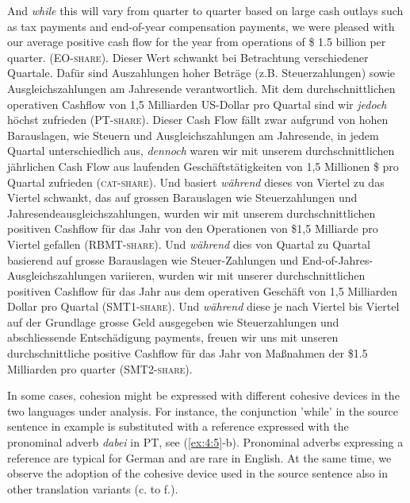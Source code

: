 \documentclass[output=paper]{LSP/langsci}
\begin{document}
\ea \label{ex:4:4}
\ea And \textit{while} this will vary from quarter to quarter based on large cash outlays such as tax payments and end-of-year compensation payments, we were pleased with our average positive cash flow for the year from operations of \$ 1.5 billion per quarter. (EO-\textsc{share}).
\ex Dieser Wert schwankt bei Betrachtung verschiedener Quartale. Dafür sind Auszahlungen hoher Beträge (z.B. Steuerzahlungen) sowie Ausgleichszahlungen am Jahresende verantwortlich. Mit dem durchschnittlichen operativen Cashflow von 1,5 Milliarden US-Dollar pro Quartal sind wir \textit{jedoch} höchst zufrieden (PT-\textsc{share}).
\ex  Dieser Cash Flow fällt zwar aufgrund von hohen Barauslagen, wie Steuern und Ausgleichszahlungen am Jahresende, in jedem Quartal unterschiedlich aus, \textit{dennoch} waren wir mit unserem durchschnittlichen jährlichen Cash Flow aus laufenden Geschäftstätigkeiten von 1,5 Millionen \$ pro Quartal zufrieden (\textsc{cat}-\textsc{share}).
\ex  Und basiert \textit{während} dieses von Viertel zu das Viertel schwankt, das auf grossen Barauslagen wie Steuerzahlungen und Jahresendeausgleichszahlungen, wurden wir mit unserem durchschnittlichen positiven Cashflow für das Jahr von den Operationen von \$1,5 Milliarde pro Viertel gefallen (RBMT-\textsc{share}).
\ex  Und \textit{während} dies von Quartal zu Quartal basierend auf grosse Barauslagen wie Steuer-Zahlungen und End-of-Jahres-Ausgleichszahlungen variieren, wurden wir mit unserer durchschnittlichen positiven Cashflow für das Jahr aus dem operativen Geschäft von 1,5 Milliarden Dollar pro Quartal (SMT1-\textsc{share}).
\ex  Und \textit{während} diese je nach Viertel bis Viertel auf der Grundlage grosse Geld ausgegeben wie Steuerzahlungen und abschliessende Entschädigung payments, freuen wir uns mit unseren durchschnittliche positive Cashflow für das Jahr von Maßnahmen der \$1.5 Milliarden pro quarter (SMT2-\textsc{share}).
\z
\z

In some cases, cohesion might be expressed with different cohesive devices in the two languages under analysis. For instance, the conjunction 'while' in the source sentence in example  is substituted with a reference expressed with the pronominal adverb \textit{dabei} in PT, see (\ref{ex:4:5}-b). Pronominal adverbs expressing a reference are typical for German and are rare in English. At the same time, we observe the adoption of the cohesive device used in the source sentence also in other translation variants (c. to f.).
\end{document}
